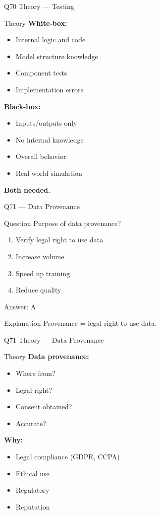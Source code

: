 \documentclass[aspectratio=169,8pt]{beamer}
\begin{document}
	\begin{frame}{Q70 Theory --- Testing}
		\begin{block}{Theory}
			\textbf{White-box:}
			\begin{itemize}
				\item Internal logic and code
				\item Model structure knowledge
				\item Component tests
				\item Implementation errors
			\end{itemize}
			\textbf{Black-box:}
			\begin{itemize}
				\item Inputs/outputs only
				\item No internal knowledge
				\item Overall behavior
				\item Real-world simulation
			\end{itemize}
			\textbf{Both needed.}
		\end{block}
	\end{frame}
	
	\begin{frame}{Q71 --- Data Provenance}
		\begin{block}{Question}
			Purpose of data provenance?
		\end{block}
		\begin{enumerate}[label=\Alph*.]
			\item Verify legal right to use data
			\item Increase volume
			\item Speed up training
			\item Reduce quality
		\end{enumerate}
		\begin{exampleblock}{Answer: A}
		\end{exampleblock}
		\begin{block}{Explanation}
			Provenance = legal right to use data.
		\end{block}
	\end{frame}
	
	\begin{frame}{Q71 Theory --- Data Provenance}
		\begin{block}{Theory}
			\textbf{Data provenance:}
			\begin{itemize}
				\item Where from?
				\item Legal right?
				\item Consent obtained?
				\item Accurate?
			\end{itemize}
			\textbf{Why:}
			\begin{itemize}
				\item Legal compliance (GDPR, CCPA)
				\item Ethical use
				\item Regulatory
				\item Reputation
			\end{itemize}
		\end{block}
	\end{frame}
	
\end{document}
